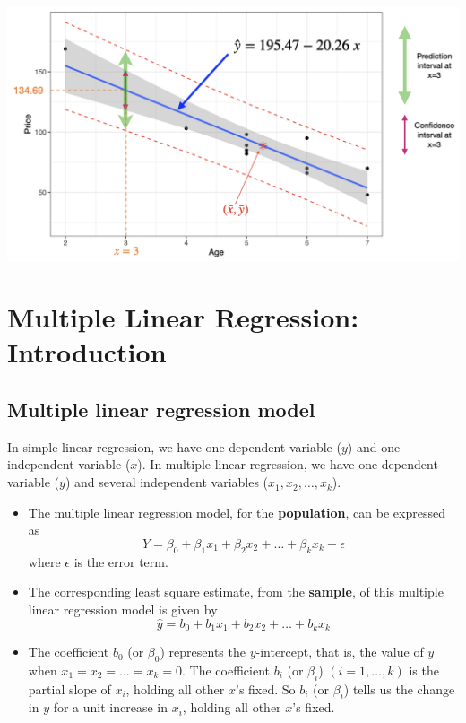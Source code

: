 \documentclass[
]{article}
\begin{document}
\begin{center}\includegraphics[width=0.8\linewidth,height=0.8\textheight]{figures/predex2} \end{center}

\hypertarget{multiple-linear-regression-introduction}{%
\section{Multiple Linear Regression:
Introduction}\label{multiple-linear-regression-introduction}}

\hypertarget{multiple-linear-regression-model}{%
\subsection{Multiple linear regression
model}\label{multiple-linear-regression-model}}

In simple linear regression, we have one dependent variable (\(y\)) and
one independent variable (\(x\)). In multiple linear regression, we have
one dependent variable (\(y\)) and several independent variables
(\(x_1,x_2, \ldots,x_k\)).

\begin{itemize}
\item
  The multiple linear regression model, for the \textbf{population}, can
  be expressed as
  \[Y=\beta_0+\beta_1 x_1 +\beta_2 x_2+\ldots+\beta_kx_k+ \epsilon\]
  where \(\epsilon\) is the error term.
\item
  The corresponding least square estimate, from the \textbf{sample}, of
  this multiple linear regression model is given by
  \[\hat{y}=b_0+b_1 x_1+b_2 x_2+\ldots+b_k x_k\]
\item
  The coefficient \(b_0\) (or \(\beta_0\)) represents the
  \(y\)-intercept, that is, the value of \(y\) when
  \(x_1=x_2= \ldots=x_k=0\). The coefficient \(b_i\) (or \(\beta_i\))
  \((i=1, \ldots, k)\) is the partial slope of \(x_i\), holding all
  other \(x\)'s fixed. So \(b_i\) (or \(\beta_i\)) tells us the change
  in \(y\) for a unit increase in \(x_i\), holding all other \(x\)'s
  fixed.
\end{itemize}
\end{document}
